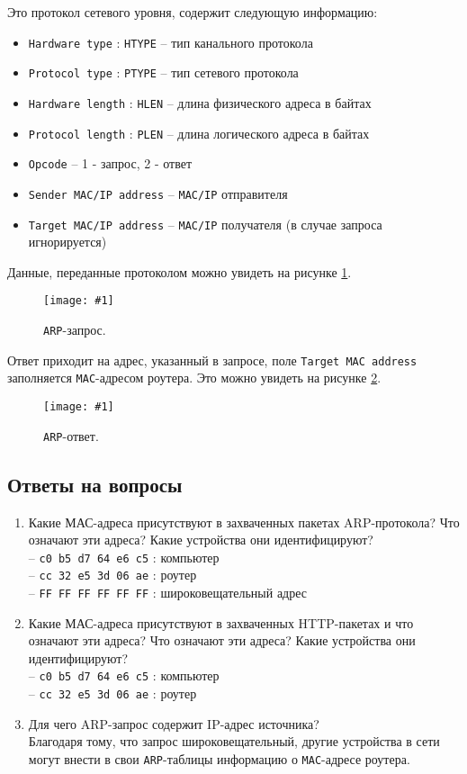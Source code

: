 \documentclass[12pt, a4paper]{article}
\newcommand{\figc}[4]{
  \begin{figure}[H]
  \begin{center}
    \texttt{[image: \#1]}
    \caption{#2}
    \label{fig:#3}
  \end{center}
  \end{figure}
}
\begin{document}
Это протокол сетевого уровня, содержит следующую информацию:

\begin{itemize}
  \item \texttt{Hardware type} : \texttt{HTYPE} -- тип канального протокола
  \item \texttt{Protocol type} : \texttt{PTYPE} -- тип сетевого протокола
  \item \texttt{Hardware length} : \texttt{HLEN} -- длина физического адреса
    в байтах
  \item \texttt{Protocol length} : \texttt{PLEN} -- длина логического адреса
    в байтах
  \item \texttt{Opcode} -- 1 - запрос, 2 - ответ
  \item \texttt{Sender MAC/IP address} -- \texttt{MAC/IP} отправителя
  \item \texttt{Target MAC/IP address} -- \texttt{MAC/IP} получателя (в случае
    запроса игнорируется)
\end{itemize}

Данные, переданные протоколом можно увидеть на рисунке \ref{fig:a_rq}.

\figc{arp_req}{\texttt{ARP}-запрос.}{a_rq}{2.5}

Ответ приходит на адрес, указанный в запросе, поле \texttt{Target MAC address}
заполняется \texttt{MAC}-адресом роутера. Это можно увидеть на рисунке \ref{fig:a_rs}.

\figc{arp_res}{\texttt{ARP}-ответ.}{a_rs}{0.7}

\subsection{Ответы на вопросы}

\begin{enumerate}
  \item Какие МАС-адреса присутствуют в захваченных пакетах ARP-протокола?
    Что означают эти адреса? Какие устройства они идентифицируют?\\
    -- \texttt{c0 b5 d7 64 e6 c5} : компьютер\\
    -- \texttt{cc 32 e5 3d 06 ae} : роутер\\
    -- \texttt{FF FF FF FF FF FF} : широковещательный адрес
  \item Какие МАС-адреса присутствуют в захваченных HTTP-пакетах и что означают
    эти адреса? Что означают эти адреса? Какие устройства они идентифицируют?\\
    -- \texttt{c0 b5 d7 64 e6 c5} : компьютер\\
    -- \texttt{cc 32 e5 3d 06 ae} : роутер
  \item Для чего ARP-запрос содержит IP-адрес источника?\\
    Благодаря тому, что запрос широковещательный, другие устройства в сети
    могут внести в свои \texttt{ARP}-таблицы информацию о \texttt{MAC}-адресе
    роутера.
\end{enumerate}
\end{document}
